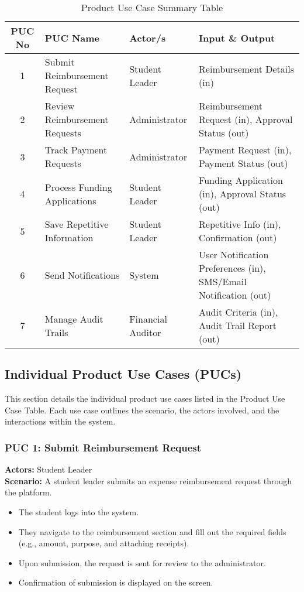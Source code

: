 \documentclass[12pt]{article}
\begin{document}
\begin{table}[h]
    \centering
    \caption{Product Use Case Summary Table}
    \begin{tabular}{|c|l|l|l|}
        \hline
        \textbf{PUC No} & \textbf{PUC Name} & \textbf{Actor/s} & \textbf{Input \& Output} \\ \hline
        1 & Submit Reimbursement Request & Student Leader & Reimbursement Details (in) \\ \hline
        2 & Review Reimbursement Requests & Administrator & Reimbursement Request (in), Approval Status (out) \\ \hline
        3 & Track Payment Requests & Administrator & Payment Request (in), Payment Status (out) \\ \hline
        4 & Process Funding Applications & Student Leader & Funding Application (in), Approval Status (out) \\ \hline
        5 & Save Repetitive Information & Student Leader & Repetitive Info (in), Confirmation (out) \\ \hline
        6 & Send Notifications & System & User Notification Preferences (in), SMS/Email Notification (out) \\ \hline
        7 & Manage Audit Trails & Financial Auditor & Audit Criteria (in), Audit Trail Report (out) \\ \hline
    \end{tabular}
\end{table}

\subsection{Individual Product Use Cases (PUCs)}
This section details the individual product use cases listed in the Product Use Case Table. Each use case outlines the scenario, the actors involved, and the interactions within the system.

\subsubsection{PUC 1: Submit Reimbursement Request}
\textbf{Actors:} Student Leader \\
\textbf{Scenario:} A student leader submits an expense reimbursement request through the platform.
\begin{itemize}
    \item The student logs into the system.
    \item They navigate to the reimbursement section and fill out the required fields (e.g., amount, purpose, and attaching receipts).
    \item Upon submission, the request is sent for review to the administrator.
    \item Confirmation of submission is displayed on the screen.
\end{itemize}
\end{document}
